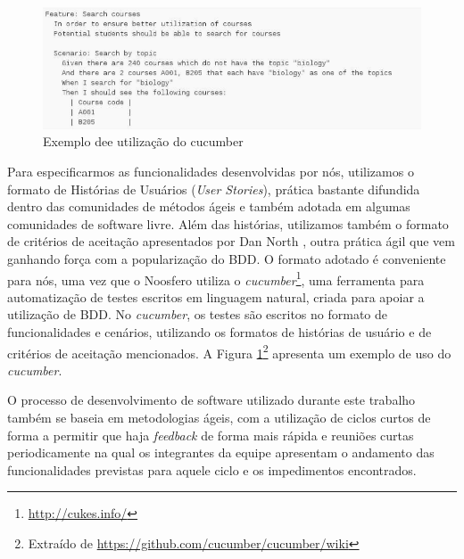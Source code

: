 \begin{figure}[htpb]
    \begin{center}
        \includegraphics[width=.37\textwidth]{images/cucumber-sample.png}
    \end{center}
    \caption{Exemplo dee utilização do cucumber}
    \label{cucumber}
\end{figure}

Para especificarmos as funcionalidades desenvolvidas por nós, utilizamos
o formato de Histórias de Usuários (\textit{User Stories}),
prática bastante difundida dentro das comunidades de métodos ágeis e também
adotada em algumas comunidades de software livre.
%
Além das histórias, utilizamos também o formato de critérios de aceitação
apresentados por Dan North \cite{north2006}, outra
prática ágil que vem ganhando força com a popularização do BDD.
%
O formato adotado é conveniente para nós, uma vez que o Noosfero utiliza o
\textit{cucumber}\footnote{\url{http://cukes.info/}}, uma ferramenta para
automatização de testes escritos em linguagem natural, criada para apoiar a
utilização de BDD. No \textit{cucumber}, os testes são escritos no formato
de funcionalidades e cenários, utilizando os formatos de histórias de
usuário e de critérios de aceitação mencionados. A Figura
\ref{cucumber}\footnote{Extraído de \url{https://github.com/cucumber/cucumber/wiki}}
apresenta um exemplo de uso do \textit{cucumber}.

O processo de desenvolvimento de software utilizado durante este trabalho
também se baseia em metodologias ágeis, com a utilização de ciclos curtos de
forma a permitir que haja \textit{feedback} de forma mais rápida e reuniões
curtas periodicamente na qual os integrantes da equipe apresentam o andamento
das funcionalidades previstas para aquele ciclo e os impedimentos encontrados.
